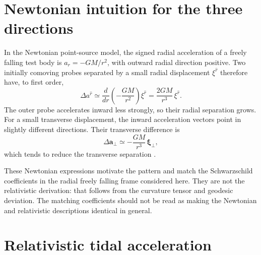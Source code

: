 \documentclass[12pt]{article}
\begin{document}
\section{Newtonian intuition for the three directions}
\label{sec:newtonian}

In the Newtonian point-source model, the signed radial acceleration of a freely falling test body is $a_r=-GM/r^2$, with outward radial direction positive. Two initially comoving probes separated by a small radial displacement $\xi^{\hat r}$ therefore have, to first order,
\begin{equation}
  \Delta a^{\hat r}
  \simeq\frac{d}{dr}\left(-\frac{GM}{r^2}\right)\xi^{\hat r}
  =\frac{2GM}{r^3}\,\xi^{\hat r}.
  \label{eq:newtonian-radial}
\end{equation}
The outer probe accelerates inward less strongly, so their radial separation grows. For a small transverse displacement, the inward acceleration vectors point in slightly different directions. Their transverse difference is
\begin{equation}
  \Delta\boldsymbol a_{\perp}
  \simeq-\frac{GM}{r^3}\,\boldsymbol\xi_{\perp},
  \label{eq:newtonian-transverse}
\end{equation}
which tends to reduce the transverse separation \cite{OregonTides}.

These Newtonian expressions motivate the pattern and match the Schwarzschild coefficients in the radial freely falling frame considered here. They are not the relativistic derivation: that follows from the curvature tensor and geodesic deviation. The matching coefficients should not be read as making the Newtonian and relativistic descriptions identical in general.

\section{Relativistic tidal acceleration}
\label{sec:geodesic-deviation}
\end{document}
